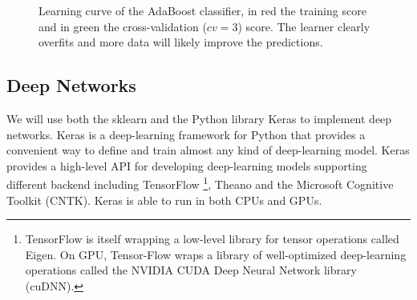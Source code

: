 \documentclass[11pt]{article}
\theoremstyle{definition}
\theoremstyle{remark}
\begin{document}
{\begin{figure}[H]
    
    \caption{Learning curve of the AdaBoost classifier, in red the training score and in green the cross-validation ($cv=3$) score. The learner clearly overfits and more data will likely improve the predictions.} \label{fig:rf_learning}
\end{figure}

%




\subsection{Deep Networks}
\label{sse:resdeep}

We will use both the sklearn and the Python library Keras to implement deep networks. Keras is a deep-learning framework for Python that provides a convenient way to define and train almost any kind of deep-learning model. 
Keras provides a high-level API for developing deep-learning models supporting different backend including TensorFlow \footnote{TensorFlow is itself wrapping a low-level library for tensor operations called Eigen. On GPU, Tensor-Flow wraps a library of well-optimized deep-learning operations called the NVIDIA CUDA Deep Neural Network library (cuDNN).}, Theano and the Microsoft Cognitive Toolkit (CNTK). Keras is able to run in both CPUs and GPUs. 

}
\end{document}
